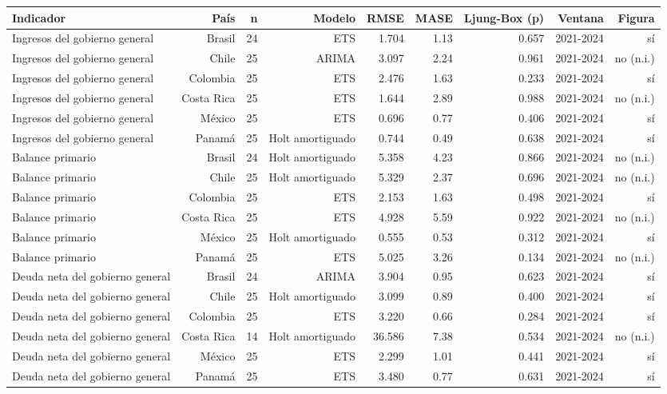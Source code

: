 
\begin{tabular}{lrrrrrrrr}
\toprule
Indicador & País & n & Modelo & RMSE & MASE & Ljung-Box (p) & Ventana & Figura\\
\midrule
Ingresos del gobierno general & Brasil & 24 & ETS & 1.704 & 1.13 & 0.657 & 2021-2024 & sí\\
Ingresos del gobierno general & Chile & 25 & ARIMA & 3.097 & 2.24 & 0.961 & 2021-2024 & no (n.i.)\\
Ingresos del gobierno general & Colombia & 25 & ETS & 2.476 & 1.63 & 0.233 & 2021-2024 & sí\\
Ingresos del gobierno general & Costa Rica & 25 & ETS & 1.644 & 2.89 & 0.988 & 2021-2024 & no (n.i.)\\
Ingresos del gobierno general & México & 25 & ETS & 0.696 & 0.77 & 0.406 & 2021-2024 & sí\\
Ingresos del gobierno general & Panamá & 25 & Holt amortiguado & 0.744 & 0.49 & 0.638 & 2021-2024 & sí\\
Balance primario & Brasil & 24 & Holt amortiguado & 5.358 & 4.23 & 0.866 & 2021-2024 & no (n.i.)\\
Balance primario & Chile & 25 & Holt amortiguado & 5.329 & 2.37 & 0.696 & 2021-2024 & no (n.i.)\\
Balance primario & Colombia & 25 & ETS & 2.153 & 1.63 & 0.498 & 2021-2024 & sí\\
Balance primario & Costa Rica & 25 & ETS & 4.928 & 5.59 & 0.922 & 2021-2024 & no (n.i.)\\
Balance primario & México & 25 & Holt amortiguado & 0.555 & 0.53 & 0.312 & 2021-2024 & sí\\
Balance primario & Panamá & 25 & ETS & 5.025 & 3.26 & 0.134 & 2021-2024 & no (n.i.)\\
Deuda neta del gobierno general & Brasil & 24 & ARIMA & 3.904 & 0.95 & 0.623 & 2021-2024 & sí\\
Deuda neta del gobierno general & Chile & 25 & Holt amortiguado & 3.099 & 0.89 & 0.400 & 2021-2024 & sí\\
Deuda neta del gobierno general & Colombia & 25 & ETS & 3.220 & 0.66 & 0.284 & 2021-2024 & sí\\
Deuda neta del gobierno general & Costa Rica & 14 & Holt amortiguado & 36.586 & 7.38 & 0.534 & 2021-2024 & no (n.i.)\\
Deuda neta del gobierno general & México & 25 & ETS & 2.299 & 1.01 & 0.441 & 2021-2024 & sí\\
Deuda neta del gobierno general & Panamá & 25 & ETS & 3.480 & 0.77 & 0.631 & 2021-2024 & sí\\

\end{tabular}
